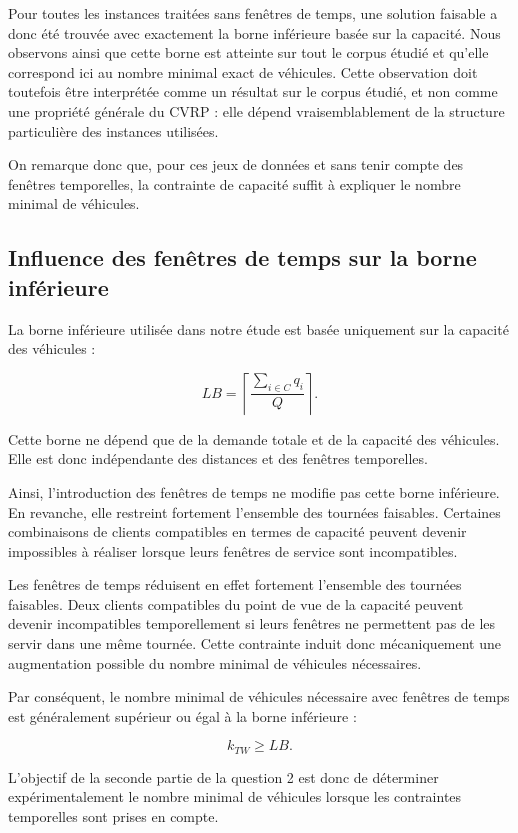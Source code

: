 \documentclass[11pt,a4paper]{article}
\begin{document}
Pour toutes les instances traitées sans fenêtres de temps, une solution faisable a donc été trouvée avec exactement la borne inférieure basée sur la capacité. Nous observons ainsi que cette borne est atteinte sur tout le corpus étudié et qu'elle correspond ici au nombre minimal exact de véhicules. Cette observation doit toutefois être interprétée comme un résultat sur le corpus étudié, et non comme une propriété générale du CVRP : elle dépend vraisemblablement de la structure particulière des instances utilisées.

On remarque donc que, pour ces jeux de données et sans tenir compte des fenêtres temporelles, la contrainte de capacité suffit à expliquer le nombre minimal de véhicules.

\subsection{Influence des fenêtres de temps sur la borne inférieure}

La borne inférieure utilisée dans notre étude est basée uniquement sur la capacité des véhicules :

\[
LB = \left\lceil \frac{\sum_{i \in C} q_i}{Q} \right\rceil.
\]

Cette borne ne dépend que de la demande totale et de la capacité des véhicules. Elle est donc indépendante des distances et des fenêtres temporelles.

Ainsi, l'introduction des fenêtres de temps ne modifie pas cette borne inférieure. En revanche, elle restreint fortement l'ensemble des tournées faisables. Certaines combinaisons de clients compatibles en termes de capacité peuvent devenir impossibles à réaliser lorsque leurs fenêtres de service sont incompatibles.

Les fenêtres de temps réduisent en effet fortement l'ensemble des tournées faisables. Deux clients compatibles du point de vue de la capacité peuvent devenir incompatibles temporellement si leurs fenêtres ne permettent pas de les servir dans une même tournée. Cette contrainte induit donc mécaniquement une augmentation possible du nombre minimal de véhicules nécessaires.

Par conséquent, le nombre minimal de véhicules nécessaire avec fenêtres de temps est généralement supérieur ou égal à la borne inférieure :

\[
k_{TW} \ge LB.
\]

L'objectif de la seconde partie de la question 2 est donc de déterminer expérimentalement le nombre minimal de véhicules lorsque les contraintes temporelles sont prises en compte.
\end{document}
